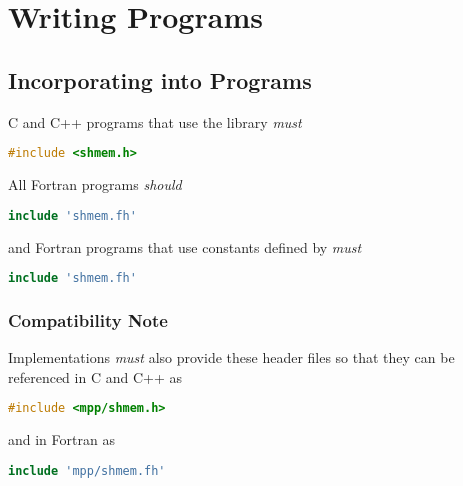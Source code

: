 \section{Writing \openshmem Programs}

\subsection{Incorporating \openshmem into Programs}


C and C++ programs that use the \openshmem library \emph{must}

\begin{lstlisting}[language=C++]
#include <shmem.h>
\end{lstlisting}

All Fortran \openshmem programs \emph{should}

\begin{lstlisting}[language=Fortran]
include 'shmem.fh'
\end{lstlisting}

and Fortran \openshmem programs that use constants defined by \openshmem
\emph{must}

\begin{lstlisting}[language=Fortran]
include 'shmem.fh'
\end{lstlisting}

\subsubsection{Compatibility Note}

Implementations \emph{must} also provide these header files so that
they can be referenced in C and C++ as

\begin{lstlisting}[language=C++]
#include <mpp/shmem.h>
\end{lstlisting}

and in Fortran as

\begin{lstlisting}[language=Fortran]
include 'mpp/shmem.fh'
\end{lstlisting}

